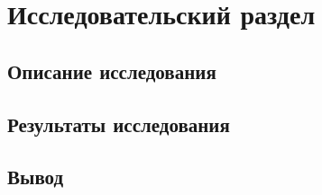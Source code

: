 \section{Исследовательский раздел}



\subsection{Описание исследования}


\subsection{Результаты исследования}

\subsection*{Вывод}

